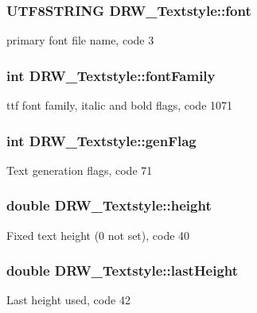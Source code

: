 \subsubsection[{font}]{\setlength{\rightskip}{0pt plus 5cm}U\+T\+F8\+S\+T\+R\+I\+N\+G D\+R\+W\+\_\+\+Textstyle\+::font}\label{class_d_r_w___textstyle_ac04f9a321fbb47a3adc3aaf65b30f02b}
primary font file name, code 3 \hypertarget{class_d_r_w___textstyle_a40ef37c402a0f1b75f481be925c85357}{}
\subsubsection[{font\+Family}]{\setlength{\rightskip}{0pt plus 5cm}int D\+R\+W\+\_\+\+Textstyle\+::font\+Family}\label{class_d_r_w___textstyle_a40ef37c402a0f1b75f481be925c85357}
ttf font family, italic and bold flags, code 1071 \hypertarget{class_d_r_w___textstyle_adec337333f98e34908076b2b1a0a10a0}{}
\subsubsection[{gen\+Flag}]{\setlength{\rightskip}{0pt plus 5cm}int D\+R\+W\+\_\+\+Textstyle\+::gen\+Flag}\label{class_d_r_w___textstyle_adec337333f98e34908076b2b1a0a10a0}
Text generation flags, code 71 \hypertarget{class_d_r_w___textstyle_a23809c13d923ae1ae43dc83c2f200e47}{}
\subsubsection[{height}]{\setlength{\rightskip}{0pt plus 5cm}double D\+R\+W\+\_\+\+Textstyle\+::height}\label{class_d_r_w___textstyle_a23809c13d923ae1ae43dc83c2f200e47}
Fixed text height (0 not set), code 40 \hypertarget{class_d_r_w___textstyle_ad7c6c347da9dfa658fabeeb46e430da4}{}
\subsubsection[{last\+Height}]{\setlength{\rightskip}{0pt plus 5cm}double D\+R\+W\+\_\+\+Textstyle\+::last\+Height}\label{class_d_r_w___textstyle_ad7c6c347da9dfa658fabeeb46e430da4}
Last height used, code 42 \hypertarget{class_d_r_w___textstyle_a5d133a89292ecc76b6a66af88039c6cc}{}
